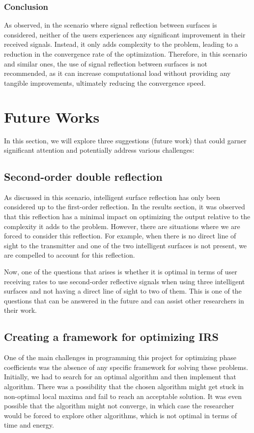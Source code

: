 \documentclass{article}
\begin{document}
\subsubsection{Conclusion}
 As observed, in the scenario where signal reflection between surfaces is considered, neither of the users experiences any significant improvement in their received signals. Instead, it only adds complexity to the problem, leading to a reduction in the convergence rate of the optimization. Therefore, in this scenario and similar ones, the use of signal reflection between surfaces is not recommended, as it can increase computational load without providing any tangible improvements, ultimately reducing the convergence speed.

\section{Future Works}
In this section, we will explore three suggestions (future work) that could garner significant attention and potentially address various challenges:

\subsection{Second-order double reflection}
As discussed in this scenario, intelligent surface reflection has only been considered up to the first-order reflection. In the results section, it was observed that this reflection has a minimal impact on optimizing the output relative to the complexity it adds to the problem. However, there are situations where we are forced to consider this reflection. For example, when there is no direct line of sight to the transmitter and one of the two intelligent surfaces is not present, we are compelled to account for this reflection.

Now, one of the questions that arises is whether it is optimal in terms of user receiving rates to use second-order reflective signals when using three intelligent surfaces and not having a direct line of sight to two of them. This is one of the questions that can be answered in the future and can assist other researchers in their work.

\subsection{Creating a framework for optimizing IRS}
One of the main challenges in programming this project for optimizing phase coefficients was the absence of any specific framework for solving these problems. Initially, we had to search for an optimal algorithm and then implement that algorithm. There was a possibility that the chosen algorithm might get stuck in non-optimal local maxima and fail to reach an acceptable solution. It was even possible that the algorithm might not converge, in which case the researcher would be forced to explore other algorithms, which is not optimal in terms of time and energy.
\end{document}
